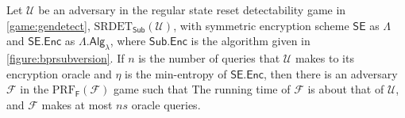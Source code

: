 \begin{theorem}\label{theorem:bprdetect}
Let $\mathcal{U}$ be an adversary in the regular state reset detectability game in \autoref{game:gendetect}, $\mathrm{SRDET}_\mathsf{Sub}(\mathcal{U})$, with symmetric encryption scheme $\mathsf{SE}$ as $\mathsf{\Lambda}$ and $\mathsf{SE.Enc}$ as $\mathsf{\Lambda.Alg}_\lambda$, where $\mathsf{Sub.Enc}$ is the algorithm given in \autoref{figure:bprsubversion}. If $n$ is the number of queries that $\mathcal{U}$ makes to its encryption oracle and $\eta$ is the min-entropy of $\mathsf{SE.Enc}$, then there is an adversary $\mathcal{F}$ in the $\mathrm{PRF}_\mathsf{F}(\mathcal{F})$ game such that
The running time of $\mathcal{F}$ is about that of $\mathcal{U}$, and $\mathcal{F}$ makes at most $ns$ oracle queries.
\end{theorem}
